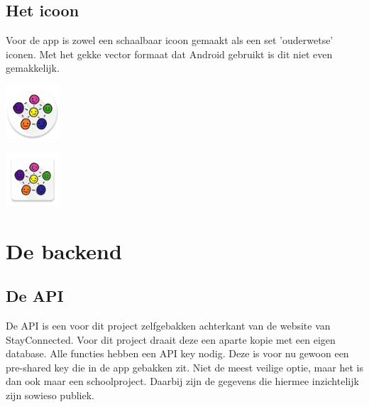 \documentclass[dutch]{report}
\begin{document}
	\subsection{Het icoon}
	Voor de app is zowel een schaalbaar icoon gemaakt als een set 'ouderwetse' iconen. Met het gekke vector
	formaat dat Android gebruikt is dit niet even gemakkelijk. 


	\begin{minipage}{0.50\textwidth}
		\begin{center}
			\includegraphics[width=2cm]{images/ic_launcher_round.png}
		\end{center}
	\end{minipage}
	\hfill
	\begin{minipage}{0.50\textwidth}
		\begin{center}
			\includegraphics[width=2cm]{images/ic_launcher.png}
		\end{center}
	\end{minipage}	
	

	
	\section{De backend}
	
	\subsection{De API}
	De API is een voor dit project zelfgebakken achterkant van de website van StayConnected. Voor dit 
	project draait deze een aparte kopie met een eigen database. Alle functies hebben een API key nodig.
	Deze is voor nu gewoon een pre-shared key die in de app gebakken zit. Niet de meest veilige optie, 
	maar het is dan ook maar een schoolproject. Daarbij zijn de gegevens die hiermee inzichtelijk zijn 
	sowieso publiek. 
	
\end{document}
